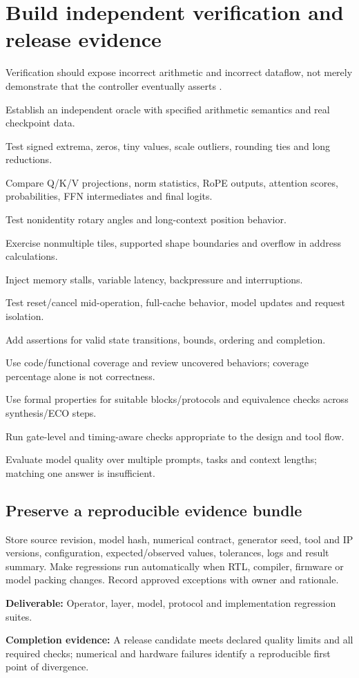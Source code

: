 \documentclass[11pt,a4paper]{article}
\newcommand{\code}[1]{\texttt{\detokenize{#1}}}
\newcommand{\phase}[2]{\clearpage\section{#1}\label{#2}}
\newcommand{\deliver}[2]{\begin{tcolorbox}[colback=pale,colframe=line,boxrule=0.5pt,arc=1mm,left=8pt,right=8pt,top=6pt,bottom=6pt]\textbf{Deliverable:} #1\par\textbf{Completion evidence:} #2\end{tcolorbox}}
\begin{document}
\phase{Build independent verification and release evidence}{sec:verification}
Verification should expose incorrect arithmetic and incorrect dataflow, not
merely demonstrate that the controller eventually asserts \code{done}.
\begin{checklist}
\item Establish an independent oracle with specified arithmetic semantics and real checkpoint data.
\item Test signed extrema, zeros, tiny values, scale outliers, rounding ties and long reductions.
\item Compare Q/K/V projections, norm statistics, RoPE outputs, attention scores,
probabilities, FFN intermediates and final logits.
\item Test nonidentity rotary angles and long-context position behavior.
\item Exercise nonmultiple tiles, supported shape boundaries and overflow in address calculations.
\item Inject memory stalls, variable latency, backpressure and interruptions.
\item Test reset/cancel mid-operation, full-cache behavior, model updates and request isolation.
\item Add assertions for valid state transitions, bounds, ordering and completion.
\item Use code/functional coverage and review uncovered behaviors; coverage percentage alone is not correctness.
\item Use formal properties for suitable blocks/protocols and equivalence checks across synthesis/ECO steps.
\item Run gate-level and timing-aware checks appropriate to the design and tool flow.
\item Evaluate model quality over multiple prompts, tasks and context lengths; matching one answer is insufficient.
\end{checklist}
\subsection*{Preserve a reproducible evidence bundle}
Store source revision, model hash, numerical contract, generator seed, tool and
IP versions, configuration, expected/observed values, tolerances, logs and result
summary. Make regressions run automatically when RTL, compiler, firmware or model
packing changes. Record approved exceptions with owner and rationale.
\deliver{Operator, layer, model, protocol and implementation regression suites.}{A
release candidate meets declared quality limits and all required checks; numerical
and hardware failures identify a reproducible first point of divergence.}
\end{document}
